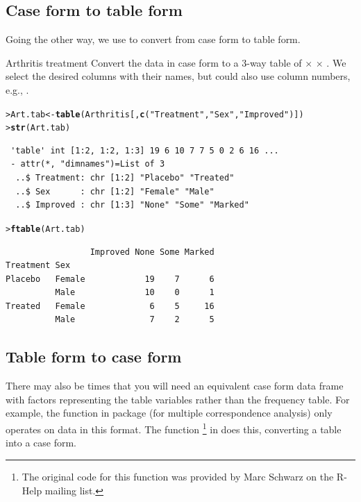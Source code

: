 \documentclass[10pt,krantz2]{krantz}\usepackage[]{graphicx}\usepackage[]{color}
\makeatletter
\newcommand{\hlstr}[1]{\textcolor[rgb]{0.192,0.494,0.8}{#1}}%
\newcommand{\hlstd}[1]{\textcolor[rgb]{0.345,0.345,0.345}{#1}}%
\newcommand{\hlkwb}[1]{\textcolor[rgb]{0.69,0.353,0.396}{#1}}%
\newcommand{\hlkwd}[1]{\textcolor[rgb]{0.737,0.353,0.396}{\textbf{#1}}}%
\newenvironment{kframe}{%
 \def\at@end@of@kframe{}%
 \ifinner\ifhmode%
  \def\at@end@of@kframe{\end{minipage}}%
  \begin{minipage}{\columnwidth}%
 \fi\fi%
 \def\FrameCommand##1{\hskip\@totalleftmargin \hskip-\fboxsep
 \colorbox{shadecolor}{##1}\hskip-\fboxsep
     \hskip-\linewidth \hskip-\@totalleftmargin \hskip\columnwidth}%
 \MakeFramed {\advance\hsize-\width
   \@totalleftmargin\z@ \linewidth\hsize
   \@setminipage}}%
 {\par\unskip\endMakeFramed%
 \at@end@of@kframe}
\newenvironment{knitrout}{}{} %
\renewenvironment{knitrout}{\small\renewcommand{\baselinestretch}{.85}}{} %
\makeatother
\begin{document}
\subsection{Case form to table form}
Going the other way, we use  to convert from case form to table form.

\begin{Example}{Arthritis treatment}
Convert the  data in case form to a 3-way table of
 $\times$  $\times$ .
We select the desired columns with their names, but could also use column
numbers, e.g., .
\begin{knitrout}
\color{fgcolor}\begin{kframe}
\begin{alltt}
\hlstd{> }\hlstd{Art.tab} \hlkwb{<-} \hlkwd{table}\hlstd{(Arthritis[,}\hlkwd{c}\hlstd{(}\hlstr{"Treatment"}\hlstd{,} \hlstr{"Sex"}\hlstd{,} \hlstr{"Improved"}\hlstd{)])}
\hlstd{> }\hlkwd{str}\hlstd{(Art.tab)}
\end{alltt}
\begin{verbatim}
 'table' int [1:2, 1:2, 1:3] 19 6 10 7 7 5 0 2 6 16 ...
 - attr(*, "dimnames")=List of 3
  ..$ Treatment: chr [1:2] "Placebo" "Treated"
  ..$ Sex      : chr [1:2] "Female" "Male"
  ..$ Improved : chr [1:3] "None" "Some" "Marked"
\end{verbatim}
\begin{alltt}
\hlstd{> }\hlkwd{ftable}\hlstd{(Art.tab)}
\end{alltt}
\begin{verbatim}
                 Improved None Some Marked
Treatment Sex                             
Placebo   Female            19    7      6
          Male              10    0      1
Treated   Female             6    5     16
          Male               7    2      5
\end{verbatim}
\end{kframe}
\end{knitrout}
\end{Example}

\subsection{Table form to case form}
There may also be times that you will need an equivalent case form data frame
with factors  representing the table variables
rather than the frequency  table.
For example, the  function in package  (for
multiple correspondence analysis)
only operates on data in this format.
The function %
\footnote{
The original code for this function was provided by Marc Schwarz on the R-Help
mailing list.
}
in 
does this, converting a table into a case form.
\end{document}
